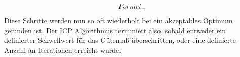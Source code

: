 \begin{equation}
Formel..
\end{equation}

\noindent Diese Schritte werden nun so oft wiederholt bei ein akzeptables Optimum gefunden ist. Der ICP Algorithmus terminiert also, sobald entweder ein definierter Schwellwert für das Gütemaß überschritten, oder eine definierte Anzahl an Iterationen erreicht wurde.
